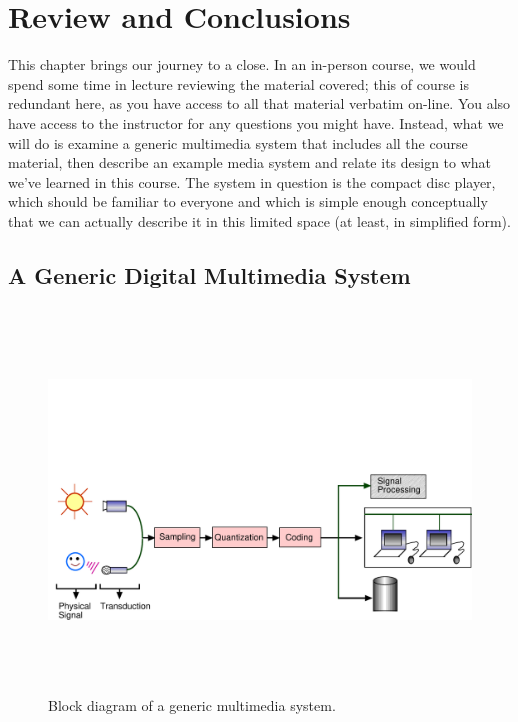
%
%
%

\chapter{Review and Conclusions}
\label{ch:review}

This chapter brings our journey to a close. In an in-person course, we
would spend some time in lecture reviewing the material covered; this
of course is redundant here, as you have access to all that material
verbatim on-line. You also have access to the instructor for any
questions you might have. Instead, what we will do is examine a generic
multimedia system that includes all the course material, then describe
an example media system and relate its design to what we've learned in
this course. The system in question is the compact disc player, which
should be familiar to everyone and which is simple enough conceptually
that we can actually describe it in this limited space (at least, in
simplified form).

\section{A Generic Digital Multimedia System}

\begin{figure}
\centerline{\includegraphics[height=4in,angle=-90]{ch-rev/fig10-1}}
\caption{Block diagram of a generic multimedia system.\label{fg:genmmsys}}
\end{figure}

